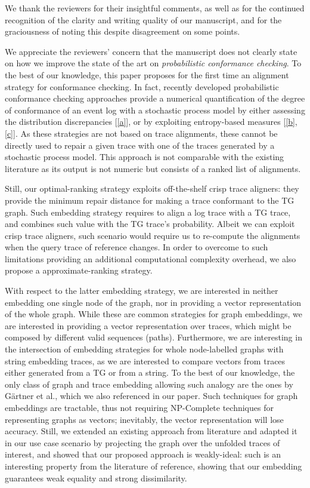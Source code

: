 \documentclass{article}
\begin{document}
We thank the reviewers for their insightful comments, as well as for the continued recognition of the clarity and writing quality of our manuscript, and for the graciousness of noting this despite disagreement on some points.



We appreciate the reviewers' concern that the manuscript does not clearly state on how we improve the state of the art on \textit{probabilistic conformance checking}. To the best of our knowledge, this paper proposes for the first time an alignment strategy for conformance checking. In fact, recently developed probabilistic conformance checking approaches
provide a numerical quantification of the degree of conformance of an event log
with a stochastic process model by either assessing the distribution discrepancies
[\ref{a}], or by exploiting entropy-based measures [\ref{b},\ref{c}]. As these strategies are not
 based on trace alignments, these cannot be directly used to repair a given trace
with one of the traces generated by a stochastic process model.
 This approach is not
comparable with the existing literature as
its output is not numeric but consists of a ranked list of alignments.

Still, our optimal-ranking strategy exploits  off-the-shelf crisp trace aligners: they provide the minimum repair distance for making a trace conformant to the TG graph. Such embedding strategy requires to align a log trace with a TG trace, and combines such value with the TG trace's probability. Albeit we can exploit crisp trace aligners, such scenario would require us to re-compute the alignments when the query trace of reference changes. In order to overcome to such limitations providing an additional computational complexity overhead, we also propose a approximate-ranking strategy.


With respect to the latter embedding strategy, we are interested in neither embedding one single node of the graph, nor in providing a vector representation of the whole graph. While these are common strategies for graph embeddings, we are interested in providing a vector representation over traces, which might be composed by different valid sequences (paths). Furthermore, we are interesting in the intersection of embedding strategies for whole node-labelled graphs with string embedding traces, as we are interested to compare vectors from traces either generated from a TG or from a string. To the best of our knowledge, the only class of graph and trace embedding allowing such analogy are the ones by Gärtner et al., which we also referenced in our paper. Such techniques for graph embeddings are tractable, thus not requiring NP-Complete techniques for representing graphs as vectors; inevitably, the vector representation will lose accuracy. Still, we extended an existing approach from literature and adapted it in our use case scenario by projecting the graph over the unfolded traces of interest, and showed that our proposed approach is weakly-ideal: such is an interesting property from the literature of reference, showing that our embedding guarantees weak equality and strong dissimilarity. 
\end{document}
